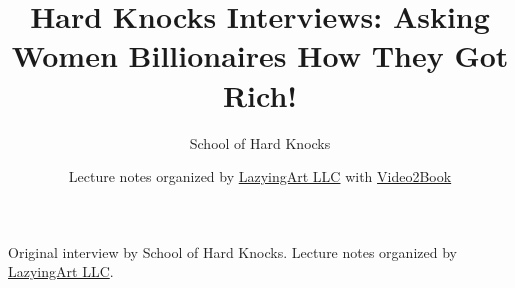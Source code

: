 \documentclass[11pt,oneside]{book}
\begin{document}
\frontmatter
\title{Hard Knocks Interviews: Asking Women Billionaires How They Got Rich!}
\author{School of Hard Knocks}
\date{Lecture notes organized by \href{https://lazying.art}{LazyingArt LLC} with \href{https://github.com/lachlanchen/Video2Book}{Video2Book}}
\maketitle
\begin{center}
\small Original interview by School of Hard Knocks. Lecture notes organized by \href{https://lazying.art}{LazyingArt LLC}.
\end{center}
\clearpage
\mainmatter

\end{document}
